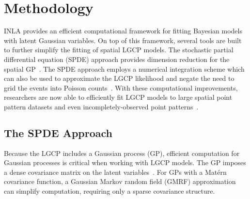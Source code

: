 \documentclass[]{interact}
\begin{document}






\section{Methodology}
\label{methods}

INLA provides an efficient computational framework for fitting Bayesian models
with latent Gaussian variables. On top of this framework, several tools are
built to further simplify the fitting of spatial LGCP models. The stochastic
partial differential equation (SPDE) approach provides dimension reduction for
the spatial GP~\cite{lindgrenetal}. The SPDE approach employs a numerical
integration scheme which can also be used to approximate the LGCP likelihood
and negate the need to grid the events into Poisson counts~\cite{simpsonetal}.
With these computational improvements, researchers are now able to efficiently
fit LGCP models to large spatial point pattern datasets and even
incompletely-observed point patterns~\cite{yuanetal}.  


\subsection{The SPDE Approach}
\label{spde}

Because the LGCP includes a Gaussian process (GP), efficient computation for
Gaussian processes is critical when working with LGCP models. The GP imposes a
dense covariance matrix on the latent variables~\cite{rinla}. For GPs with a
Mat\'{e}rn covariance function, a Gaussian Markov random field (GMRF)
approximation can simplify computation, requiring only a sparse covariance
structure.
\end{document}
